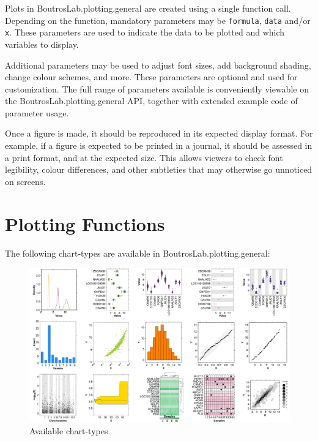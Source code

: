\documentclass[letterpaper]{report}\usepackage[]{graphicx}\usepackage[]{color}
\begin{document}
Plots in BoutrosLab.plotting.general are created using a single function call. Depending on the function, mandatory parameters may be \verb|formula|, \verb|data| and/or \verb|x|. These parameters are used to indicate the data to be plotted and which variables to display.

Additional parameters may be used to adjust font sizes, add background shading, change colour schemes, and more. These parameters are optional and used for customization. The full range of parameters available is conveniently viewable on the BoutrosLab.plotting.general API, together with extended example code of parameter usage.

Once a figure is made, it should be reproduced in its expected display format. For example, if a figure is expected to be printed in a journal, it should be assessed in a print format, and at the expected size. This allows viewers to check font legibility, colour differences, and other subtleties that may otherwise go unnoticed on screens.

\section{Plotting Functions}
The following  chart-types are available in BoutrosLab.plotting.general:

\begin{figure}[!ht]
  \begin{center}
     \includegraphics[width=150mm]{Figures/chart-types.png}
     \caption{Available chart-types}
  \end{center}
\end{figure}
\end{document}
